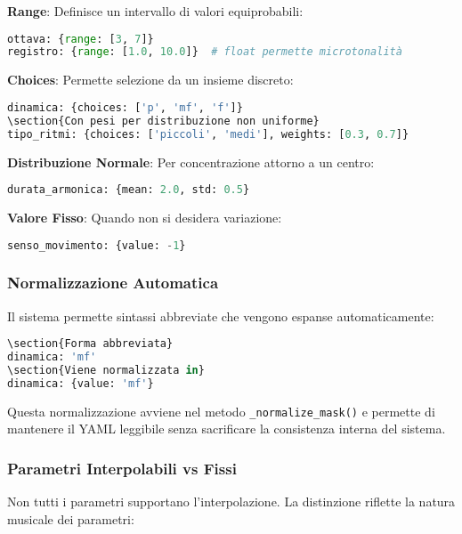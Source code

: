 \textbf{Range}: Definisce un intervallo di valori equiprobabili:
\begin{lstlisting}[language=Python]
ottava: {range: [3, 7]}
registro: {range: [1.0, 10.0]}  # float permette microtonalità
\end{lstlisting}

\textbf{Choices}: Permette selezione da un insieme discreto:
\begin{lstlisting}[language=Python]
dinamica: {choices: ['p', 'mf', 'f']}
\section{Con pesi per distribuzione non uniforme}
tipo_ritmi: {choices: ['piccoli', 'medi'], weights: [0.3, 0.7]}
\end{lstlisting}

\textbf{Distribuzione Normale}: Per concentrazione attorno a un centro:
\begin{lstlisting}[language=Python]
durata_armonica: {mean: 2.0, std: 0.5}
\end{lstlisting}

\textbf{Valore Fisso}: Quando non si desidera variazione:
\begin{lstlisting}[language=Python]
senso_movimento: {value: -1}
\end{lstlisting}
\subsubsection{Normalizzazione Automatica}
Il sistema permette sintassi abbreviate che vengono espanse automaticamente:

\begin{lstlisting}[language=Python]
\section{Forma abbreviata}
dinamica: 'mf'
\section{Viene normalizzata in}
dinamica: {value: 'mf'}
\end{lstlisting}

Questa normalizzazione avviene nel metodo \texttt{\_normalize\_mask()} e permette di mantenere il YAML leggibile senza sacrificare la consistenza interna del sistema.
\subsubsection{Parametri Interpolabili vs Fissi}
Non tutti i parametri supportano l'interpolazione. La distinzione riflette la natura musicale dei parametri:

